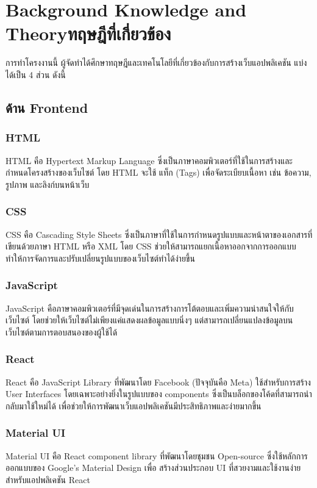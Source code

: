 \chapter{\ifenglish Background Knowledge and Theory\else ทฤษฎีที่เกี่ยวข้อง\fi}

การทำโครงงานนี้ ผู้จัดทำได้ศึกษาทฤษฎีและเทคโนโลยีที่เกี่ยวข้องกับการสร้างเว็บแอปพลิเคชัน
แบ่งได้เป็น 4 ส่วน ดังนี้
\section{ด้าน Frontend}
\subsection{HTML}
HTML คือ Hypertext Markup Language ซึ่งเป็นภาษาคอมพิวเตอร์ที่ใช้ในการสร้างและกำหนดโครงสร้างของเว็บไซต์ โดย HTML จะใช้ แท็ก (Tags) เพื่อจัดระเบียบเนื้อหา เช่น ข้อความ, รูปภาพ และลิงก์บนหน้าเว็บ 
\cite{html1}
\subsection{CSS}
CSS คือ Cascading Style Sheets ซึ่งเป็นภาษาที่ใช้ในการกำหนดรูปแบบและหน้าตาของเอกสารที่เขียนด้วยภาษา HTML หรือ XML โดย CSS ช่วยให้สามารถแยกเนื้อหาออกจากการออกแบบ ทำให้การจัดการและปรับเปลี่ยนรูปแบบของเว็บไซต์ทำได้ง่ายขึ้น
\cite{css1}\cite{css2}
\subsection{JavaScript}
JavaScript คือภาษาคอมพิวเตอร์ที่มีจุดเด่นในการสร้างการโต้ตอบและเพิ่มความน่าสนใจให้กับเว็บไซต์ 
โดยช่วยให้เว็บไซต์ไม่เพียงแค่แสดงผลข้อมูลแบบนิ่งๆ แต่สามารถเปลี่ยนแปลงข้อมูลบนเว็บไซต์ตามการตอบสนองของผู้ใช้ได้
\cite{javascript1}\cite{javascript2}
\subsection{React}
React คือ JavaScript Library ที่พัฒนาโดย Facebook (ปัจจุบันคือ Meta) ใช้สำหรับการสร้าง User Interfaces โดยเฉพาะอย่างยิ่งในรูปแบบของ components ซึ่งเป็นบล็อกของโค้ดที่สามารถนำกลับมาใช้ใหม่ได้
เพื่อช่วยให้การพัฒนาเว็บแอปพลิเคชันมีประสิทธิภาพและง่ายมากขึ้น \cite{react1}\cite{react2}
\subsection{Material UI}
Material UI คือ React component library ที่พัฒนาโดยชุมชน Open-source ซึ่งใช้หลักการออกแบบของ Google's Material Design เพื่อ
สร้างส่วนประกอบ UI ที่สวยงามและใช้งานง่ายสำหรับแอปพลิเคชัน React \cite{mui}\cite{mui2}
